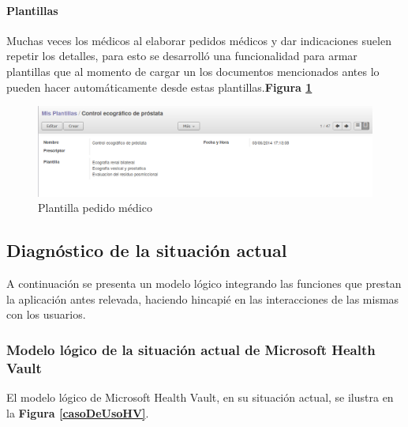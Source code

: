 \paragraph{Plantillas}

Muchas veces los médicos al elaborar pedidos médicos y dar indicaciones suelen repetir los detalles, para esto se desarrolló una funcionalidad para armar plantillas que al momento de cargar un los documentos mencionados antes lo pueden hacer automáticamente desde estas plantillas.\textbf{Figura \ref{plantilla}}


\begin{figure}[h]
      \centering
      \includegraphics[width=.8\textwidth]{img/tp1/HE/PlantillaPM}
      \caption{Plantilla pedido médico}
      \label{plantilla}
\end{figure}

\subsection{Diagnóstico de la situación actual}
A continuación se presenta un modelo lógico integrando las funciones que prestan la aplicación antes relevada, haciendo hincapié en las interacciones de las mismas con los usuarios.


\subsubsection{Modelo lógico de la situación actual de Microsoft Health Vault}

El modelo lógico de Microsoft Health Vault, en su situación actual, se ilustra en la \textbf{Figura \ref{casoDeUsoHV}}.

